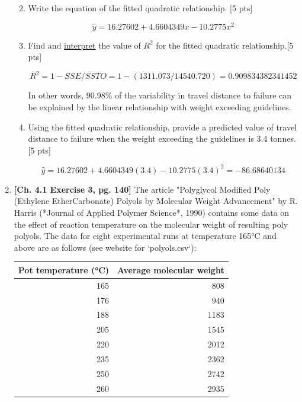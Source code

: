 \documentclass[11pt]{article}\usepackage[]{graphicx}\usepackage[]{color}
\begin{document}
\begin{enumerate}
\begin{enumerate}
\vspace{0.3cm}
       \item Write the equation of the fitted quadratic relationship. [5 pts]
       
             $$\hat{y} = 16.27602 + 4.6604349 x - 10.2775 x^2$$
             
       \item Find and \underline{interpret} the value of $R^2$ for the fitted quadratic relationship.[5 pts]
       
             $$R^2 = 1 - SSE/SSTO = 1 - (1311.073/14540.720) = 0.909834382341452$$
             
      In other words, 90.98\% of the variability in travel distance to failure can be explained by the linear relationship with weight exceeding guidelines.
       
       \item Using the fitted quadratic relationship, provide a predicted value of travel distance to failure when the weight exceeding the guidelines is 3.4 tonnes.[5 pts]

   $$ \hat{y} = 16.27602 + 4.6604349 (3.4) - 10.2775 (3.4)^2 = -86.68640134$$
   
\end{enumerate}




	
	\item \textbf{[Ch. 4.1 Exercise 3, pg. 140]} The article "Polyglycol Modified Poly (Ethylene EtherCarbonate) Polyols by Molecular Weight Advancement" by R. Harris (*Journal of Applied Polymer Science*, 1990) contains some data on the effect of reaction temperature on the molecular weight of resulting poly polyols. The data for eight experimental runs at temperature 165°C and above are as follows (see website for `polyols.csv`):
\begin{center}
\begin{tabular}{r|r}
    \hline
    Pot temperature (°C) & Average molecular weight\\
    \hline
    165 & 808\\
    \hline
    176 & 940\\
    \hline
    188 & 1183\\
    \hline
    205 & 1545\\
    \hline
    220 & 2012\\
    \hline
    235 & 2362\\
    \hline
    250 & 2742\\
    \hline
    260 & 2935\\
    \hline
\end{tabular}
\end{center}
	

\end{enumerate}
\end{document}
